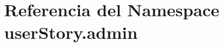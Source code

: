 \hypertarget{namespaceuser_story_1_1admin}{}\section{Referencia del Namespace user\+Story.\+admin}
\label{namespaceuser_story_1_1admin}
